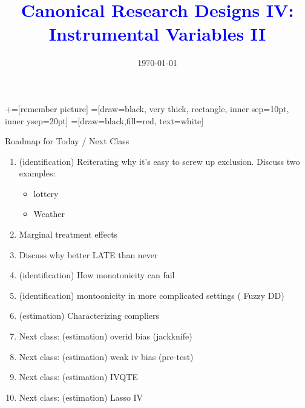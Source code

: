 \documentclass[notes,11pt, aspectratio=169]{beamer}
\title[]{\textcolor{blue}{Canonical Research Designs IV:\\ Instrumental Variables II }}
\author[PGP]{}
\institute[FRBNY]{\small{\begin{tabular}{c}
  Paul Goldsmith-Pinkham  \\
\end{tabular}}}
\date{\today}
\begin{document}
\newcommand\marktopleft[1]{%
    \tikz[overlay,remember picture] 
        \node (marker-#1-a) at (-.3em,.3em) {};%
}
\newcommand\markbottomright[2]{%
    \tikz[overlay,remember picture] 
        \node (marker-#1-b) at (0em,0em) {};%
}
+=[remember picture] 
 =[draw=black, very thick, rectangle, inner sep=10pt, inner ysep=20pt]
 =[draw=black,fill=red, text=white]

\begin{frame}
\maketitle
\end{frame}

\begin{frame}{Roadmap for Today / Next Class}
    \begin{enumerate}
    \item (identification) Reiterating why it's easy to screw up exclusion. Discuss two examples:
      \begin{itemize}
      \item lottery
      \item Weather
      \end{itemize}
    \item Marginal treatment effects
    \item Discuss why better LATE than never      
    \item (identification) How monotonicity can fail
    \item (identification) montoonicity in more complicated settings ( Fuzzy DD)
    \item (estimation) Characterizing compliers
    \item Next class: (estimation) overid bias (jackknife)
    \item Next class: (estimation) weak iv bias (pre-test)
    \item Next class: (estimation) IVQTE
    \item Next class: (estimation) Lasso IV
    \end{enumerate}

\end{frame}
\end{document}
